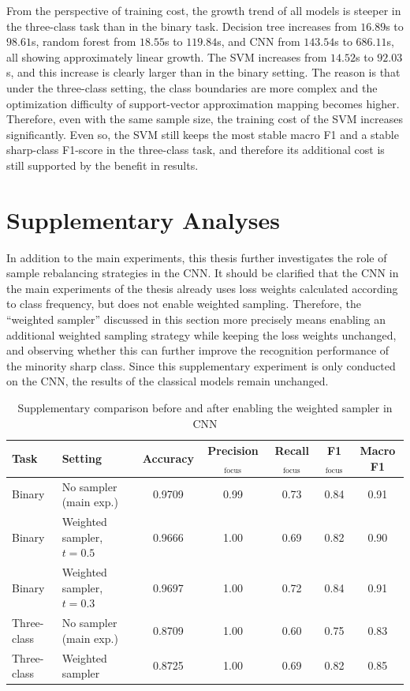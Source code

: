 \par From the perspective of training cost, the growth trend of all models is
steeper in the three-class task than in the binary task. Decision tree
increases from $16.89$s to $98.61$s, random forest from $18.55$s to
$119.84$s, and CNN from $143.54$s to $686.11$s, all showing approximately
linear growth. The SVM increases from $14.52$s to $92.03$s, and this increase
is clearly larger than in the binary setting. The reason is that under the
three-class setting, the class boundaries are more complex and the optimization
difficulty of support-vector approximation mapping becomes higher. Therefore,
even with the same sample size, the training cost of the SVM increases
significantly. Even so, the SVM still keeps the most stable macro F1 and a
stable sharp-class F1-score in the three-class task, and therefore its
additional cost is still supported by the benefit in results.

\section{Supplementary Analyses}
\par In addition to the main experiments, this thesis further investigates the
role of sample rebalancing strategies in the CNN. It should be clarified that
the CNN in the main experiments of the thesis already uses loss weights
calculated according to class frequency, but does not enable weighted sampling.
Therefore, the ``weighted sampler'' discussed in this section more precisely
means enabling an additional weighted sampling strategy while keeping the loss
weights unchanged, and observing whether this can further improve the
recognition performance of the minority sharp class. Since this supplementary
experiment is only conducted on the CNN, the results of the classical models
remain unchanged.

\begin{table}[htbp]
    \centering
    \caption{Supplementary comparison before and after enabling the weighted sampler in CNN}
    \label{tab:supp-weighted-sampler}
    \begin{tabular}{llccccc}
        \toprule
        Task & Setting & Accuracy & Precision$_{\mathrm{focus}}$ &
        Recall$_{\mathrm{focus}}$ & F1$_{\mathrm{focus}}$ & Macro F1 \\
        \midrule
        Binary & No sampler (main exp.)     & 0.9709 & 0.99 & 0.73 & 0.84 & 0.91
        \\
        Binary & Weighted sampler, $t=0.5$  & 0.9666 & 1.00 & 0.69 & 0.82 & 0.90
        \\
        Binary & Weighted sampler, $t=0.3$  & 0.9697 & 1.00 & 0.72 & 0.84 & 0.91
        \\
        Three-class & No sampler (main exp.)    & 0.8709 & 1.00 & 0.60 & 0.75 &
        0.83 \\
        Three-class & Weighted sampler          & 0.8725 & 1.00 & 0.69 & 0.82 &
        0.85 \\
        \bottomrule
    \end{tabular}
\end{table}

